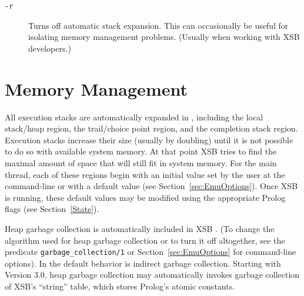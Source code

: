 \begin{description}
\item[{\tt -r}] Turns off automatic stack expansion.  This can
  occasionally be useful for isolating memory management problems.
  (Usually when working with XSB developers.)
%
%
%
\end{description}

\section{Memory Management}\label{memory_management}
 

All execution stacks are automatically expanded in \version{},
including the local stack/heap region, the trail/choice point region,
and the completion stack region.  Execution stacks increase their size
(usually by doubling) until it is not possible to do so with available
system memory.  At that point XSB tries to find the maximal amount of
space that will still fit in system memory.  For the main thread, each
of these regions begin with an initial value set by the user at the
command-line or with a default value (see
Section~\ref{sec:EmuOptions}).
Once XSB is running, these
default values may be modified using the appropriate Prolog flags (see
Section~\ref{State}).

Heap garbage collection is automatically included in XSB
\cite{CaSC01,CATmem@ISMM-98}.  (To change the algorithm used for heap
garbage collection or to turn it off altogether, see the predicate
{\tt garbage\_collection/1} or Section~\ref{sec:EmuOptions} for
command-line options).  In \version{} the default behavior is indirect
garbage collection.  Starting with Version 3.0, heap garbage
collection may automatically invokes garbage collection of XSB's
``string'' table, which stores Prolog's atomic constants.

